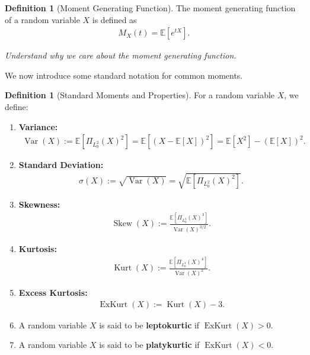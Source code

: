 \documentclass[11pt,reqno]{amsart}
\theoremstyle{definition}
\newtheorem{definition}[theorem]{Definition}
\theoremstyle{remark}
\begin{document}
\begin{definition}[Moment Generating Function]
	The moment generating function of a random variable \(X\) is defined as
	\begin{align*}
		M_X(t) = \mathbb{E}[e^{tX}].
	\end{align*}
\end{definition}

\begin{todo}
	\itshape Understand why we care about the moment generating function.
\end{todo}

We now introduce some standard notation for common moments.

\begin{definition}[Standard Moments and Properties]
	For a random variable \(X\), we define:
	\begin{enumerate}[label=(\roman*)]
		\item \textbf{Variance:}
		      \begin{align*}
			      \operatorname{Var}(X) := \mathbb{E}\left[ \Pi_{L^2_0}(X)^2 \right] = \mathbb{E}[(X - \mathbb{E}[X])^2] = \mathbb{E}[X^2] - (\mathbb{E}[X])^2.
		      \end{align*}

		\item \textbf{Standard Deviation:}
		      \begin{align*}
			      \sigma(X) := \sqrt{\operatorname{Var}(X)} = \sqrt{\mathbb{E}\left[ \Pi_{L^2_0}(X)^2 \right]}.
		      \end{align*}

		\item \textbf{Skewness:}
		      \begin{align*}
			      \operatorname{Skew}(X) := \frac{\mathbb{E}\left[ \Pi_{L^3_0}(X)^3 \right]}{\operatorname{Var}(X)^{3/2}}.
		      \end{align*}

		\item \textbf{Kurtosis:}
		      \begin{align*}
			      \operatorname{Kurt}(X) := \frac{\mathbb{E}\left[ \Pi_{L^4_0}(X)^4 \right]}{\operatorname{Var}(X)^2}.
		      \end{align*}

		\item \textbf{Excess Kurtosis:}
		      \begin{align*}
			      \operatorname{ExKurt}(X) := \operatorname{Kurt}(X) - 3.
		      \end{align*}

		\item A random variable \(X\) is said to be \textbf{leptokurtic} if \(\operatorname{ExKurt}(X) > 0\).

		\item A random variable \(X\) is said to be \textbf{platykurtic} if \(\operatorname{ExKurt}(X) < 0\).
	\end{enumerate}
\end{definition}
\end{document}
